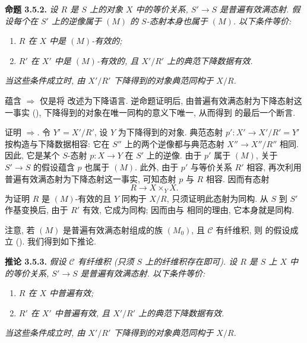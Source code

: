 \medskip
\noindent{}\textbf{命题 3.5.2.}
\textit{设 \(R\) 是 \(S\) 上的对象 \(X\) 中的等价关系,
\(S'\to S\) 是普遍有效满态射. 假设每个在 \(S'\) 上的逆像属于
\((M)\) 的 \(S\)-态射本身也属于 \((M)\). 以下条件等价:}
\begin{enumerate}
  \item[(i)]
  \textit{\(R\) 在 \(X\) 中是 \((M)\)-有效的;}
  \item[(ii)]
  \textit{\(R'\) 在 \(X'\) 中是 \((M)\)-有效的,
  且 \(X'/R'\) 上的典范下降数据有效.}
\end{enumerate}
\textit{当这些条件成立时, 由 \(X'/R'\) 下降得到的对象典范同构于 \(X/R\).}

蕴含 \(\Rightarrow\)
仅是将  改述为下降语言.
逆命题证明后, 由普遍有效满态射为下降态射这一事实
(),
下降得到的对象在唯一同构的意义下唯一,
从而得到  的最后一个断言.

证明 \(\Rightarrow\).
令 \(Y'=X'/R'\), 设 \(Y\) 为下降得到的对象.
典范态射 \(p':X'\to X'/R'=Y'\) 按构造与下降数据相容:
它在 \(S''\) 上的两个逆像都与典范态射 \(X''\to X''/R''\) 相同.
因此, 它是某个 \(S\)-态射 \(p:X\to Y\) 在 \(S'\) 上的逆像.
由于 \(p'\) 属于 \((M)\), 关于 \(S'\to S\) 的假设蕴含
\(p\) 也属于 \((M)\). 此外, 由于 \(p'\) 与等价关系 \(R'\) 相容,
再次利用普遍有效满态射为下降态射这一事实, 可知态射 \(p\) 与 \(R\) 相容.
因而有态射
\[
  R\longrightarrow X\times_YX.
\]
为证明 \(R\) 是 \((M)\)-有效的且 \(Y\) 同构于 \(X/R\),
只须证明此态射为同构. 从 \(S\) 到 \(S'\) 作基变换后,
由于 \(R'\) 有效, 它成为同构;
因而由与  相同的理由,
它本身就是同构.

注意, 若 \((M)\) 是普遍有效满态射组成的族 \((M_0)\),
且 \(\mathscr C\) 有纤维积, 则
 的假设成立
(). 我们得到如下推论.

\medskip
\noindent{}\textbf{推论 3.5.3.}
\textit{假设 \(\mathscr C\) 有纤维积 (只须 \(S\) 上的纤维积存在即可).
设 \(R\) 是 \(S\) 上 \(X\) 中的等价关系,
\(S'\to S\) 是普遍有效满态射. 以下条件等价:}
\begin{enumerate}
  \item[(i)]
  \textit{\(R\) 在 \(X\) 中普遍有效;}
  \item[(ii)]
  \textit{\(R'\) 在 \(X'\) 中普遍有效,
  且 \(X'/R'\) 上的典范下降数据有效.}
\end{enumerate}
\textit{当这些条件成立时, 由 \(X'/R'\) 下降得到的对象典范同构于 \(X/R\).}

